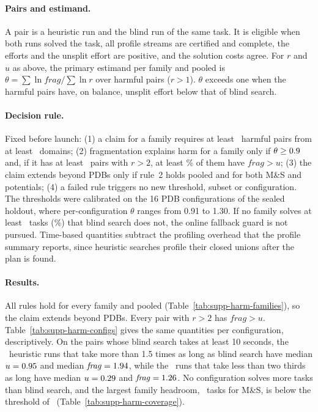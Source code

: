 \documentclass[letterpaper]{article}
\newcommand{\fragfactor}{\ensuremath{\mathit{frag}}}
\theoremstyle{plain}
\theoremstyle{definition}
\theoremstyle{remark}
\begin{document}
\paragraph{Pairs and estimand.}
A pair is a heuristic run and the blind run of the same task.  It is
eligible when both runs solved the task, all profile streams are certified
and complete, the efforts and the unsplit effort are positive, and the
solution costs agree.  For $r$ and $u$ as above, the primary estimand per
family and pooled is $\theta=\sum\ln\fragfactor/\sum\ln r$ over harmful pairs
($r>1$).  $\theta$ exceeds one when the harmful pairs have, on balance, unsplit
effort below that of blind search.

\paragraph{Decision rule.}
Fixed before launch: (1) a claim for a family requires at least
\GenSupportPairs\ harmful pairs from at least \GenSupportDomains\ domains;
(2) fragmentation explains harm for a family only if $\theta\geq0.9$
and, if it has at least \GenStrongSupportPairs\ pairs with $r>2$, at least
\GenStrongThresholdPercent\% of them have $\fragfactor>u$; (3) the claim
extends beyond PDBs only if rule~2 holds pooled and for both M\&S and
potentials; (4) a failed rule triggers no new threshold, subset or
configuration.  The thresholds were calibrated on the 16 PDB configurations
of the sealed holdout, where per-configuration $\theta$ ranges from 0.91 to 1.30.
If no family solves at least \GenGuardTasks\ tasks (\GenGuardPercent\%) that
blind search does not, the online fallback guard is not pursued.  Time-based quantities subtract the profiling overhead that
the profile summary reports, since heuristic searches profile their closed
unions after the plan is found.

\paragraph{Results.}
All rules hold for every family and pooled (Table~\ref{tab:supp-harm-families}),
so the claim extends beyond PDBs.  Every pair with $r>2$ has
$\fragfactor>u$.  Table~\ref{tab:supp-harm-configs} gives the same
quantities per configuration, descriptively.  On the pairs whose blind
search takes at least 10 seconds, the \GenAllTimeHarm\ heuristic runs that
take more than 1.5 times as long as blind search have median
$u=0.95$ and median $\fragfactor=\GenAllTimeHarmFrag$, while
the \GenAllTimeHelp\ runs that take less than two thirds as long have median
$u=0.29$ and $\fragfactor=\GenAllTimeHelpFrag$.  No
configuration solves more tasks than blind search, and the largest family
headroom, \GenMaxHeadroom\ tasks for M\&S, is below the threshold of
\GenGuardTasks\ (Table~\ref{tab:supp-harm-coverage}).
\end{document}

